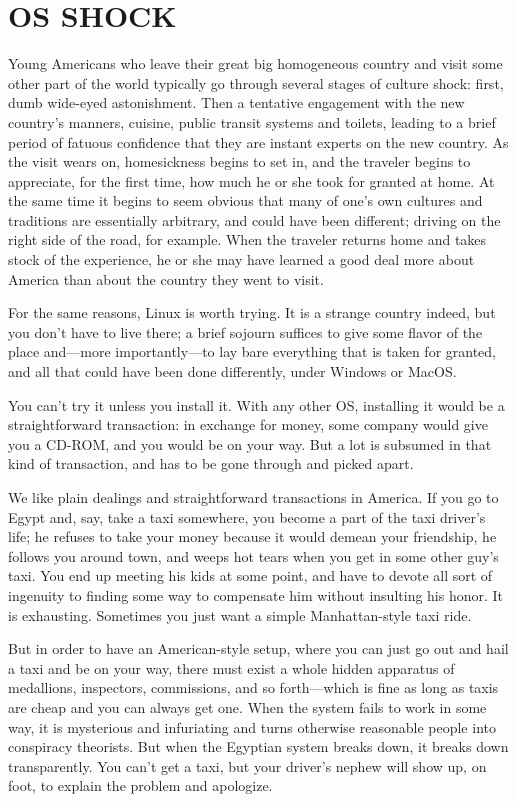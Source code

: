 \documentclass[
  fontsize=11pt,
  paper=landscape,
  twocolumn=true,
  pagesize=pdftex,
  headings=small,
  DIV=15,
  ]{scrartcl}
\begin{document}
\section{OS SHOCK}

Young Americans who leave their great big homogeneous country and visit
some other part of the world typically go through several stages of
culture shock: first, dumb wide-eyed astonishment. Then a tentative
engagement with the new country's manners, cuisine, public transit
systems and toilets, leading to a brief period of fatuous confidence
that they are instant experts on the new country. As the visit wears on,
homesickness begins to set in, and the traveler begins to appreciate,
for the first time, how much he or she took for granted at home. At the
same time it begins to seem obvious that many of one's own cultures and
traditions are essentially arbitrary, and could have been different;
driving on the right side of the road, for example. When the traveler
returns home and takes stock of the experience, he or she may have
learned a good deal more about America than about the country they went
to visit.

For the same reasons, Linux is worth trying. It is a strange country
indeed, but you don't have to live there; a brief sojourn suffices to
give some flavor of the place and---more importantly---to lay bare
everything that is taken for granted, and all that could have been done
differently, under Windows or MacOS.

You can't try it unless you install it. With any other OS, installing it
would be a straightforward transaction: in exchange for money, some
company would give you a CD-ROM, and you would be on your way. But a lot
is subsumed in that kind of transaction, and has to be gone through and
picked apart.

We like plain dealings and straightforward transactions in America. If
you go to Egypt and, say, take a taxi somewhere, you become a part of
the taxi driver's life; he refuses to take your money because it would
demean your friendship, he follows you around town, and weeps hot tears
when you get in some other guy's taxi. You end up meeting his kids at
some point, and have to devote all sort of ingenuity to finding some way
to compensate him without insulting his honor. It is exhausting.
Sometimes you just want a simple Manhattan-style taxi ride.

But in order to have an American-style setup, where you can just go out
and hail a taxi and be on your way, there must exist a whole hidden
apparatus of medallions, inspectors, commissions, and so forth---which
is fine as long as taxis are cheap and you can always get one. When the
system fails to work in some way, it is mysterious and infuriating and
turns otherwise reasonable people into conspiracy theorists. But when
the Egyptian system breaks down, it breaks down transparently. You can't
get a taxi, but your driver's nephew will show up, on foot, to explain
the problem and apologize.
\end{document}
